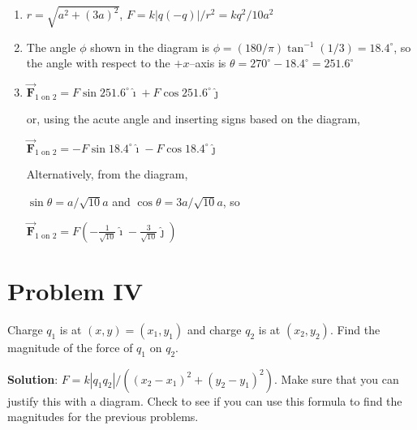\documentclass{article}
\renewcommand{\mbox}{\text}
\newcommand{\ds}[0]{\displaystyle}
\newcommand{\ihat}[0]{\hat{\boldsymbol{\imath}}}
\newcommand{\jhat}[0]{\hat{\boldsymbol{\jmath}}}
\newcommand{\bfvec}[1]{\vec{\mathbf{#1}}}
\begin{document}
    \begin{enumerate}

      \item $r=\sqrt{a^2+(3a)^2}$, $F=k|q(-q)|/r^2=kq^2/10a^2$

      \item The angle $\phi$ shown in the diagram is $\phi=(180/\pi)\tan^{-1}(1/3)=18.4^\circ$, so the angle with respect to the $+x$--axis is $\theta=270^\circ-18.4^\circ=251.6^\circ$

      \item $\bfvec{F}_{1\mbox{ on } 2}=F\sin251.6^\circ\ihat + F\cos251.6^\circ\jhat$

            or, using the acute angle and inserting signs based on the diagram,

            $\bfvec{F}_{1\mbox{ on } 2}=-F\sin 18.4^\circ\ihat - F\cos18.4^\circ\jhat$

            Alternatively, from the diagram,

            $\sin\theta = a/\sqrt{10}a$ and $\cos\theta = 3a/\sqrt{10}a$, so

            $\ds\bfvec{F}_{1\mbox{ on } 2} = F\left(-\frac{1}{\sqrt{10}}\ihat - \frac{3}{\sqrt{10}}\jhat\right)$

    \end{enumerate}
\else



\vskip 144pt
\fi

\section{Problem IV}

Charge $q_1$ is at $(x,y)=(x_1,y_1)$ and charge $q_2$ is at $(x_2, y_2)$. Find the magnitude of the force of $q_1$ on $q_2$.

\ifsolutions
{\bf Solution}: $F=k|q_1q_2|/\left((x_2-x_1)^2 + (y_2-y_1)^2\right)$. Make sure that you can justify this with a diagram. Check to see if you can use this formula to find the magnitudes for the previous problems.
\fi
\end{document}
